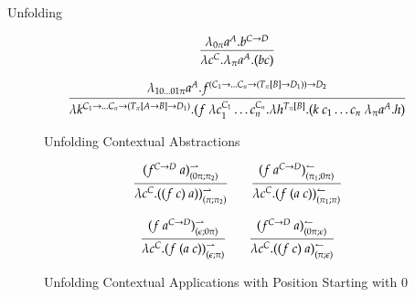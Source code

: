 \documentclass[9pt]{beamer}
\begin{document}
\begin{frame}{Unfolding}
\begin{figure}[h!]
\begin{calculus}
$$
\infer{\lambda c^C. \lambda_{\pi} a^A. (b c)}
{\lambda_{0\pi} a^A. b^{C \imp D}}
$$

$$
\infer{ \lambda k^{C_1 \imp \ldots C_n \imp (T_{\pi}[A \imp B] \imp D_1)}. (f \ \lambda c_1^{C_1} \ldots c_n^{C_n}. \lambda h^{T_{\pi}[B]}. (k \ c_1 \ldots c_n \ \lambda_{\pi} a^A. h)}
{ \lambda_{10\ldots01\pi} a^A. f^{(C_1 \imp \ldots C_n \imp (T_{\pi}[B] \imp D_1)) \imp D_2} }
$$
\end{calculus}
\caption{Unfolding Contextual Abstractions}
\label{figure:Unfolding}
\end{figure}

\begin{figure}[h!]
\begin{calculus}
$$
\infer{ \lambda c^C. ((f \ c) \ a))^{\rightharpoonup}_{(\pi;\pi_2)} }
{(f^{C \imp D} \ a)^{\rightharpoonup}_{(0\pi;\pi_2)}}
%
\qquad
%
\infer{ \lambda c^C. (f \ (a \ c))^{\leftharpoonup}_{(\pi_1;\pi)} }
{ (f \ a^{C \imp D})^{\leftharpoonup}_{(\pi_1;0\pi)} }
$$

$$
\infer{ \lambda c^C. (f \ (a \ c))^{\rightharpoonup}_{(\eS;\pi)} }
{ (f \ a^{C \imp D})^{\rightharpoonup}_{(\eS;0\pi)} }
%
\qquad
%
\infer{ \lambda c^C. ((f \ c) \ a)^{\leftharpoonup}_{(\pi;\eS)} }
{ (f^{C \imp D} \ a)^{\leftharpoonup}_{(0\pi;\eS)} }
$$
\end{calculus}
\caption{Unfolding Contextual Applications with Position Starting with $0$}
\label{figure:Unfolding}
\end{figure}
\end{frame}
\end{document}
